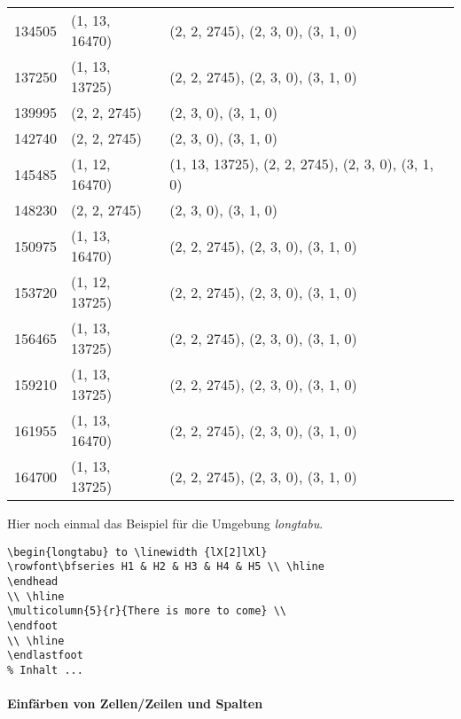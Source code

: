 \begin{center}
\begin{longtable}{|l|l|l|}
		134505 & (1, 13, 16470) & (2, 2, 2745), (2, 3, 0), (3, 1, 0) \\
		137250 & (1, 13, 13725) & (2, 2, 2745), (2, 3, 0), (3, 1, 0) \\
		139995 & (2, 2, 2745) & (2, 3, 0), (3, 1, 0) \\
		142740 & (2, 2, 2745) & (2, 3, 0), (3, 1, 0) \\
		145485 & (1, 12, 16470) & (1, 13, 13725), (2, 2, 2745), (2, 3, 0), (3, 1, 0) \\
		148230 & (2, 2, 2745) & (2, 3, 0), (3, 1, 0) \\
		150975 & (1, 13, 16470) & (2, 2, 2745), (2, 3, 0), (3, 1, 0) \\
		153720 & (1, 12, 13725) & (2, 2, 2745), (2, 3, 0), (3, 1, 0) \\
		156465 & (1, 13, 13725) & (2, 2, 2745), (2, 3, 0), (3, 1, 0) \\
		159210 & (1, 13, 13725) & (2, 2, 2745), (2, 3, 0), (3, 1, 0) \\
		161955 & (1, 13, 16470) & (2, 2, 2745), (2, 3, 0), (3, 1, 0) \\
		164700 & (1, 13, 13725) & (2, 2, 2745), (2, 3, 0), (3, 1, 0) \\
	\end{longtable}
\end{center}

Hier noch einmal das Beispiel für die Umgebung \emph{longtabu}.
\begin{lstlisting}[style=LaTeX]
\begin{longtabu} to \linewidth {lX[2]lXl}
\rowfont\bfseries H1 & H2 & H3 & H4 & H5 \\ \hline 
\endhead
\\ \hline
\multicolumn{5}{r}{There is more to come} \\
\endfoot
\\ \hline
\endlastfoot
% Inhalt ...
\end{lstlisting}


\paragraph{Einfärben von Zellen/Zeilen und Spalten}
